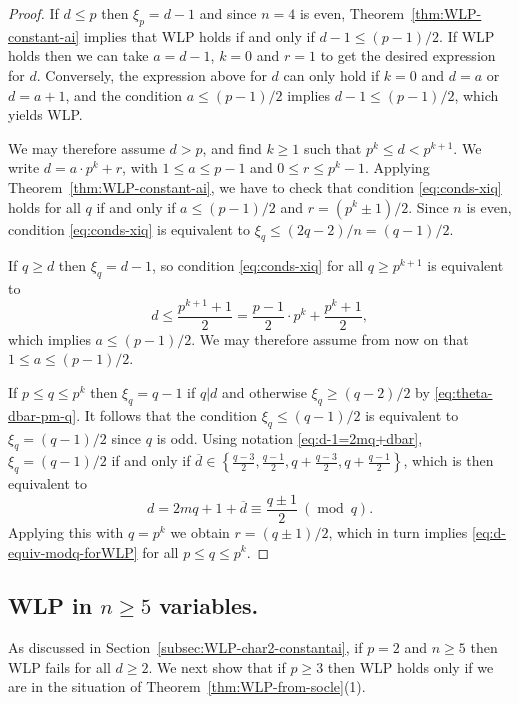 \documentclass[11pt,reqno]{amsart}
\newcommand{\ol}[1]{\overline{#1}}
\newcommand{\op}[1]{\operatorname{#1}}
\theoremstyle{definition}
\theoremstyle{remark}
\numberwithin{equation}{section}
\begin{document}
\begin{proof} If $d\leq p$ then $\xi_p=d-1$ and since $n=4$ is even, Theorem~\ref{thm:WLP-constant-ai} implies that WLP holds if and only if $d-1\leq(p-1)/2$. If WLP holds then we can take $a=d-1$, $k=0$ and $r=1$ to get the desired expression for $d$. Conversely, the expression above for $d$ can only hold if $k=0$ and $d=a$ or $d=a+1$, and the condition $a\leq (p-1)/2$ implies $d-1\leq(p-1)/2$, which yields WLP.

We may therefore assume $d>p$, and find $k\geq 1$ such that $p^k\leq d<p^{k+1}$. We write $d=a\cdot p^k+r$, with $1\leq a\leq p-1$ and $0\leq r\leq p^k-1$. Applying Theorem~\ref{thm:WLP-constant-ai}, we have to check that condition \eqref{eq:conds-xiq} holds for all $q$ if and only if $a\leq(p-1)/2$ and $r=(p^k\pm 1)/2$. Since $n$ is even, condition \eqref{eq:conds-xiq} is equivalent to $\xi_q\leq(2q-2)/n=(q-1)/2$. 

If $q\geq d$ then $\xi_q=d-1$, so condition \eqref{eq:conds-xiq} for all $q\geq p^{k+1}$ is equivalent to
\[ d \leq \frac{p^{k+1}+1}{2} = \frac{p-1}{2}\cdot p^k + \frac{p^k+1}{2},\]
which implies $a\leq(p-1)/2$. We may therefore assume from now on that $1\leq a\leq(p-1)/2$.

If $p\leq q\leq p^k$ then $\xi_q=q-1$ if $q|d$ and otherwise $\xi_q\geq(q-2)/2$ by \eqref{eq:theta-dbar-pm-q}. It follows that the condition $\xi_q\leq(q-1)/2$ is equivalent to $\xi_q=(q-1)/2$ since $q$ is odd. Using notation \eqref{eq:d-1=2mq+dbar}, $\xi_q=(q-1)/2$ if and only if $\ol{d}\in\left\{\frac{q-3}{2},\frac{q-1}{2},q+\frac{q-3}{2},q+\frac{q-1}{2}\right\}$, which is then equivalent to
\begin{equation}\label{eq:d-equiv-modq-forWLP} 
d=2mq+1+\ol{d} \equiv \frac{q\pm 1}{2} \ (\op{mod}\ q).
\end{equation}
Applying this with $q=p^k$ we obtain $r=(q\pm 1)/2$, which in turn implies \eqref{eq:d-equiv-modq-forWLP} for all $p\leq q\leq p^k$.
\end{proof}

\subsection{WLP in $n\geq 5$ variables.} 

As discussed in Section~\ref{subsec:WLP-char2-constantai}, if $p=2$ and $n\geq 5$ then WLP fails for all $d\geq 2$. We next show that if $p\geq 3$ then WLP holds only if we are in the situation of Theorem~\ref{thm:WLP-from-socle}(1).
\end{document}
